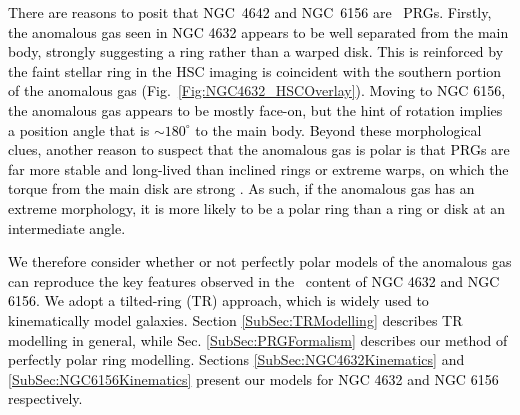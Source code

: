 \documentclass[fleqn,usenatbib]{mnras}
\newcommand{\hi}{\text{H\,\sc{i}}}
\newcommand{\KS}[1]{\textcolor{black}{#1}}
\begin{document}
\textcolor{black}{There are reasons to \KS{posit} that NGC~4642 and NGC~6156 are \hi\ PRGs.  Firstly, the anomalous gas seen in NGC 4632 appears to be well separated from the main body, strongly suggesting \KS{a ring rather than a warped disk.}  This is reinforced by the faint stellar ring in the HSC imaging is coincident with the southern portion of the anomalous gas (Fig.~\ref{Fig:NGC4632_HSCOverlay}).  Moving to NGC 6156, the anomalous gas appears to be mostly face-on, but the hint of rotation implies a position angle that is $\sim180^{\circ}$ to the main body.  Beyond these morphological clues, another reason to suspect that the anomalous gas is polar is that PRGs are far more stable and long-lived than inclined rings or extreme warps, \KS{on which the torque from the main disk are strong} \citep{Bournaud2003,Brook2008}.  As such, if the anomalous gas has an extreme morphology, \KS{it is more likely to be a polar ring than a ring or disk at an intermediate angle.} }



\KS{We therefore consider whether or not perfectly polar models of the anomalous gas can reproduce the key features observed in the \hi\ content of NGC 4632 and NGC 6156.  We adopt a tilted-ring (TR) approach, which is widely used to kinematically model galaxies.}  \textcolor{black}{Section \ref{SubSec:TRModelling} describes TR modelling in general, while Sec. \ref{SubSec:PRGFormalism} describes our method of perfectly polar ring modelling.  Sections \ref{SubSec:NGC4632Kinematics} and \ref{SubSec:NGC6156Kinematics} present our models for NGC 4632 and NGC 6156 respectively.  }


\end{document}
